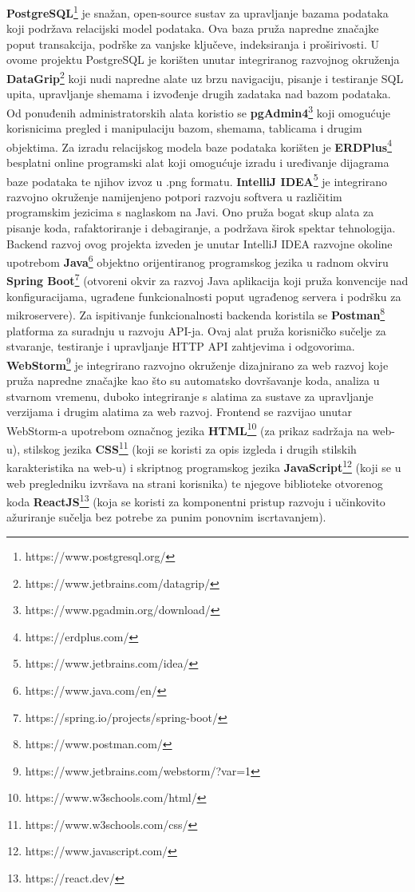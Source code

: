 			\newline\newline
			\noindent\textbf{PostgreSQL}\footnote[8]{https://www.postgresql.org/} je snažan, open-source sustav za upravljanje bazama podataka koji podržava relacijski model podataka. Ova baza pruža napredne značajke poput transakcija, podrške za vanjske ključeve, indeksiranja i proširivosti. U ovome projektu PostgreSQL je korišten unutar integriranog razvojnog okruženja \textbf{DataGrip}\footnote[9]{https://www.jetbrains.com/datagrip/} koji nudi napredne alate uz brzu navigaciju, pisanje i testiranje SQL upita, upravljanje shemama i izvođenje drugih zadataka nad bazom podataka. Od ponuđenih administratorskih alata koristio se \textbf{pgAdmin4}\footnote[10]{https://www.pgadmin.org/download/} koji omogućuje korisnicima pregled i manipulaciju bazom, shemama, tablicama i drugim objektima. Za izradu relacijskog modela baze podataka korišten je \textbf{ERDPlus}\footnote[11]{https://erdplus.com/} besplatni online programski alat koji omogućuje izradu i uređivanje dijagrama baze podataka te njihov izvoz u .png formatu.
			\newline\newline
			\noindent\textbf{IntelliJ IDEA}\footnote[12]{https://www.jetbrains.com/idea/} je integrirano razvojno okruženje namijenjeno potpori razvoju softvera u različitim programskim jezicima s naglaskom na Javi. Ono pruža bogat skup alata za pisanje koda, rafaktoriranje i debagiranje, a podržava širok spektar tehnologija. Backend razvoj ovog projekta izveden je unutar IntelliJ IDEA razvojne okoline upotrebom \textbf{Java}\footnote[13]{https://www.java.com/en/} objektno orijentiranog programskog jezika u radnom okviru \textbf{Spring Boot}\footnote[14]{https://spring.io/projects/spring-boot/} (otvoreni okvir za razvoj Java aplikacija koji pruža konvencije nad konfiguracijama, ugrađene funkcionalnosti poput ugrađenog servera i podršku za mikroservere). Za ispitivanje funkcionalnosti backenda koristila se \textbf{Postman}\footnote[15]{https://www.postman.com/} platforma za suradnju u razvoju API-ja. Ovaj alat pruža korisničko sučelje za stvaranje, testiranje i upravljanje HTTP API zahtjevima i odgovorima.
			\newline\newline
			\noindent\textbf{WebStorm}\footnote[16]{https://www.jetbrains.com/webstorm/?var=1} je integrirano razvojno okruženje dizajnirano za web razvoj koje pruža napredne značajke kao što su automatsko dovršavanje koda, analiza u stvarnom vremenu, duboko integriranje s alatima za sustave za upravljanje verzijama i drugim alatima za web razvoj. Frontend se razvijao unutar WebStorm-a upotrebom označnog jezika \textbf{HTML}\footnote[17]{https://www.w3schools.com/html/} (za prikaz sadržaja na web-u), stilskog jezika \textbf{CSS}\footnote[18]{https://www.w3schools.com/css/} (koji se koristi za opis izgleda i drugih stilskih karakteristika na web-u) i skriptnog programskog jezika \textbf{JavaScript}\footnote[19]{https://www.javascript.com/} (koji se u web pregledniku izvršava na strani korisnika) te njegove biblioteke otvorenog koda \textbf{ReactJS}\footnote[20]{https://react.dev/} (koja se koristi za komponentni pristup razvoju i učinkovito ažuriranje sučelja bez potrebe za punim ponovnim iscrtavanjem).
